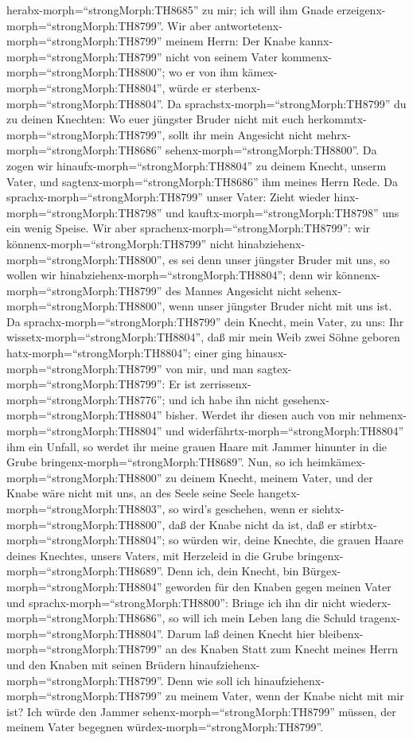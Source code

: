 herabx-morph=``strongMorph:TH8685'' zu mir; ich will ihm Gnade
erzeigenx-morph=``strongMorph:TH8799''.  Wir aber
antwortetenx-morph=``strongMorph:TH8799'' meinem Herrn: Der Knabe
kannx-morph=``strongMorph:TH8799'' nicht von seinem Vater
kommenx-morph=``strongMorph:TH8800''; wo er von ihm
kämex-morph=``strongMorph:TH8804'', würde er
sterbenx-morph=``strongMorph:TH8804''.  Da
sprachstx-morph=``strongMorph:TH8799'' du zu deinen Knechten: Wo euer
jüngster Bruder nicht mit euch herkommtx-morph=``strongMorph:TH8799'',
sollt ihr mein Angesicht nicht mehrx-morph=``strongMorph:TH8686''
sehenx-morph=``strongMorph:TH8800''.  Da zogen wir
hinaufx-morph=``strongMorph:TH8804'' zu deinem Knecht, unserm Vater, und
sagtenx-morph=``strongMorph:TH8686'' ihm meines Herrn Rede.
 Da sprachx-morph=``strongMorph:TH8799'' unser Vater: Zieht
wieder hinx-morph=``strongMorph:TH8798'' und
kauftx-morph=``strongMorph:TH8798'' uns ein wenig Speise. 
Wir aber sprachenx-morph=``strongMorph:TH8799'': wir
könnenx-morph=``strongMorph:TH8799'' nicht
hinabziehenx-morph=``strongMorph:TH8800'', es sei denn unser jüngster
Bruder mit uns, so wollen wir hinabziehenx-morph=``strongMorph:TH8804'';
denn wir könnenx-morph=``strongMorph:TH8799'' des Mannes Angesicht nicht
sehenx-morph=``strongMorph:TH8800'', wenn unser jüngster Bruder nicht
mit uns ist.  Da sprachx-morph=``strongMorph:TH8799'' dein
Knecht, mein Vater, zu uns: Ihr wissetx-morph=``strongMorph:TH8804'',
daß mir mein Weib zwei Söhne geboren hatx-morph=``strongMorph:TH8804'';
 einer ging hinausx-morph=``strongMorph:TH8799'' von mir,
und man sagtex-morph=``strongMorph:TH8799'': Er ist
zerrissenx-morph=``strongMorph:TH8776''; und ich habe ihn nicht
gesehenx-morph=``strongMorph:TH8804'' bisher.  Werdet ihr
diesen auch von mir nehmenx-morph=``strongMorph:TH8804'' und
widerfährtx-morph=``strongMorph:TH8804'' ihm ein Unfall, so werdet ihr
meine grauen Haare mit Jammer hinunter in die Grube
bringenx-morph=``strongMorph:TH8689''.  Nun, so ich
heimkämex-morph=``strongMorph:TH8800'' zu deinem Knecht, meinem Vater,
und der Knabe wäre nicht mit uns, an des Seele seine Seele
hangetx-morph=``strongMorph:TH8803'',  so wird's geschehen,
wenn er siehtx-morph=``strongMorph:TH8800'', daß der Knabe nicht da ist,
daß er stirbtx-morph=``strongMorph:TH8804''; so würden wir, deine
Knechte, die grauen Haare deines Knechtes, unsers Vaters, mit Herzeleid
in die Grube bringenx-morph=``strongMorph:TH8689''.  Denn
ich, dein Knecht, bin Bürgex-morph=``strongMorph:TH8804'' geworden für
den Knaben gegen meinen Vater und sprachx-morph=``strongMorph:TH8800'':
Bringe ich ihn dir nicht wiederx-morph=``strongMorph:TH8686'', so will
ich mein Leben lang die Schuld tragenx-morph=``strongMorph:TH8804''.
 Darum laß deinen Knecht hier
bleibenx-morph=``strongMorph:TH8799'' an des Knaben Statt zum Knecht
meines Herrn und den Knaben mit seinen Brüdern
hinaufziehenx-morph=``strongMorph:TH8799''.  Denn wie soll
ich hinaufziehenx-morph=``strongMorph:TH8799'' zu meinem Vater, wenn der
Knabe nicht mit mir ist? Ich würde den Jammer
sehenx-morph=``strongMorph:TH8799'' müssen, der meinem Vater begegnen
würdex-morph=``strongMorph:TH8799''.

